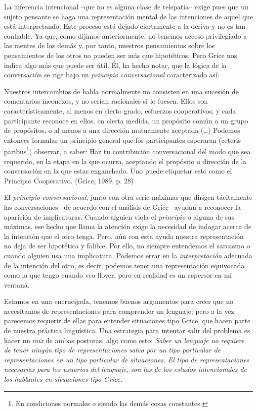 \documentclass[]{book}
\begin{document}
\begin{refsection}
La inferencia intencional --que no es alguna clase de telepatía-- exige
pues que un sujeto pensante se haga una representación mental de las
intenciones de aquel que está interpretando. Este proceso está dejado
ciertamente a la deriva y no es tan confiable. Ya que, como dijimos
anteriormente, no tenemos acceso privilegiado a las mentes de los demás
y, por tanto, nuestros pensamientos sobre los pensamientos de los otros
no pueden ser más que hipotéticos. Pero Grice nos indica algo más que
puede ser útil. Él, ha hecho notar, que la lógica de la conversación se
rige bajo un \emph{principio conversacional} caracterizado así:

Nuestros intercambios de habla normalmente no consisten en una sucesión
de comentarios inconexos, y no serían racionales si lo fuesen. Ellos son
característicamente, al menos en cierto grado, esfuerzos cooperativos; y
cada participante reconoce en ellos, en cierta medida, un propósito
común o un grupo de propósitos, o al menos a una dirección mutuamente
aceptada (\ldots{}) Podemos entonces formular un principio general que
los participantes esperaran (ceteris paribus\footnote{En condiciones
  normales o siendo las demás cosas constantes.}) observar, a saber: Haz
tu contribución conversacional del modo que sea requerido, en la etapa
en la que ocurra, aceptando el propósito o dirección de la conversación
en la que estas enganchado. Uno puede etiquetar esto como el Principio
Cooperativo. (Grice, 1989, p. 28)

El \emph{principio conversacional}, junto con otra serie máximas que
dirigen tácitamente las conversaciones --de acuerdo con el análisis de
Grice-- ayudan a reconocer la aparición de implicaturas. Cuando alguien
viola el \emph{principio} o alguna de sus máximas, ese hecho que llama
la atención exige la necesidad de indagar acerca de la intención que el
otro tenga. Pero, aún con esta ayuda nuestra representación no deja de
ser hipotética y falible. Por ello, no siempre entendemos el sarcasmo o
cuando alguien usa una implicatura. Podemos errar en la
\emph{interpretación} adecuada de la intención del otro, es decir,
podemos tener una representación equivocada como la que tengo cuando veo
llover, pero en realidad es un aspersor en mi ventana.

Estamos en una encrucijada, tenemos buenos argumentos para creer que no
necesitamos de representaciones para comprender un lenguaje; pero a la
vez parecemos requerir de ellas para entender situaciones tipo Grice,
que hacen parte de nuestra práctica lingüística. Una estrategia para
intentar salir del problema es hacer un \emph{mix} de ambas posturas,
algo como esto: \emph{Saber un lenguaje no requiere de tener ningún tipo
de representaciones salvo por un tipo particular de representaciones en
un tipo particular de situaciones. El tipo de representaciones
necesarias para los usuarios del lenguaje, son las de los estados
intencionales de los hablantes en situaciones tipo Grice.}


\end{refsection}
\end{document}
